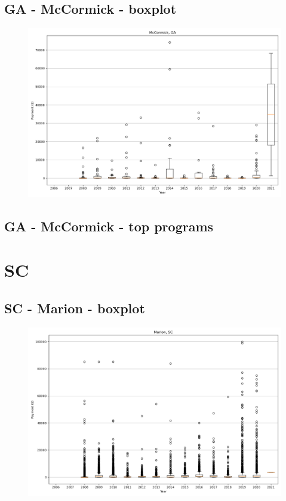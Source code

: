 \subsection*{GA - McCormick - boxplot}
\begin{figure}[h]
\centering
\includegraphics[width=7in]{../output/boxplots/counties/McCormick-GA_boxplot.png}
\end{figure}


\subsection*{GA - McCormick - top programs}

\newpage
\section*{SC}
\subsection*{SC - Marion - boxplot}
\begin{figure}[h]
\centering
\includegraphics[width=7in]{../output/boxplots/counties/Marion-SC_boxplot.png}
\end{figure}


